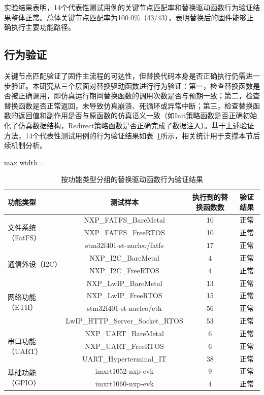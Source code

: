 实验结果表明，14个代表性测试用例的关键节点匹配率和替换驱动函数行为验证结果整体正常。总体关键节点匹配率为100.0\%（43/43），表明替换后的固件能够正确执行主要功能路径。

\subsection{行为验证}

关键节点匹配验证了固件主流程的可达性，但替换代码本身是否正确执行仍需进一步验证。本研究从三个层面对替换驱动函数进行行为验证：第一，检查替换函数是否被正确调用，即仿真运行期间替换函数的调用次数是否与预期一致；第二，检查替换函数是否正常返回，未导致仿真崩溃、死循环或异常中断；第三，检查替换函数的返回值和副作用是否与原函数的仿真语义一致（如Init策略函数是否正确初始化了仿真数据结构，Redirect策略函数是否正确完成了数据注入）。基于上述验证方法，14个代表性测试用例的行为验证结果如表~\ref{tab:function_results}所示，相关统计用于支撑本节后续机制分析。

\begin{table}[H]
\centering
\caption{按功能类型分组的替换驱动函数行为验证结果}
\label{tab:function_results}
\footnotesize
\begin{adjustbox}{max width=\textwidth}
\begin{tabular}{lccc}
\toprule
\textbf{功能类型} & \textbf{测试样本} & \textbf{执行到的替换函数数} & \textbf{验证结果} \\
\midrule
\multirow{3}{*}{文件系统（FatFS）} & NXP\_FATFS\_BareMetal & 10 & 正常 \\
& NXP\_FATFS\_FreeRTOS & 10 & 正常 \\
& stm32f401-st-nucleo/fatfs & 17 & 正常 \\
\midrule
\multirow{2}{*}{通信外设（I2C）} & NXP\_I2C\_BareMetal & 4 & 正常 \\
& NXP\_I2C\_FreeRTOS & 4 & 正常 \\
\midrule
\multirow{4}{*}{网络功能（ETH）} & NXP\_LwIP\_BareMetal & 13 & 正常 \\
& NXP\_LwIP\_FreeRTOS & 15 & 正常 \\
& stm32f401-st-nucleo/eth & 56 & 正常 \\
& LwIP\_HTTP\_Server\_Socket\_RTOS & 53 & 正常 \\
\midrule
\multirow{3}{*}{串口功能（UART）} & NXP\_UART\_BareMetal & 6 & 正常 \\
& NXP\_UART\_FreeRTOS & 6 & 正常 \\
& UART\_Hyperterminal\_IT & 38 & 正常 \\
\midrule
\multirow{2}{*}{基础功能（GPIO）} & imxrt1052-nxp-evk & 9 & 正常 \\
& imxrt1060-nxp-evk & 4 & 正常 \\
\bottomrule
\end{tabular}
\end{adjustbox}
\end{table}

